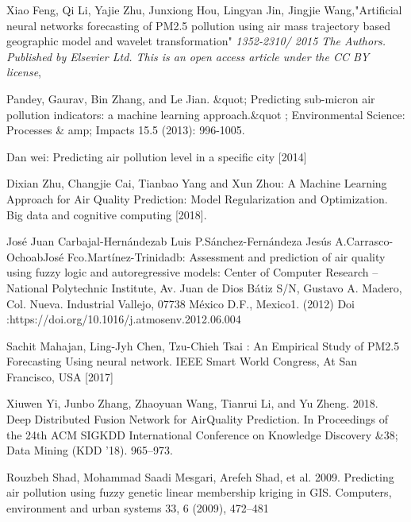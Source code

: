 \clearpage
{}
\begin{thebibliography}{99}

Xiao Feng, Qi Li, Yajie Zhu, Junxiong Hou, Lingyan Jin, Jingjie Wang,"Artificial neural networks forecasting of PM2.5 pollution using air mass
trajectory based geographic model and wavelet transformation" {\em 1352-2310/ 2015 The Authors. Published by Elsevier Ltd. This is an open access article under the CC BY license}, 


Pandey, Gaurav, Bin Zhang, and Le Jian. \&quot; Predicting sub-micron air pollution indicators: a machine learning approach.\&quot ; Environmental Science: Processes \& amp; Impacts 15.5 (2013): 996-1005.

Dan wei: Predicting air pollution level in a specific city
[2014]

Dixian Zhu, Changjie Cai, Tianbao Yang and Xun Zhou: A
Machine Learning Approach for Air Quality Prediction:
Model Regularization and Optimization. Big data and
cognitive computing [2018].

José Juan Carbajal-Hernándezab Luis P.Sánchez-Fernándeza
Jesús A.Carrasco-OchoabJosé Fco.Martínez-Trinidadb:
Assessment and prediction of air quality using fuzzy logic
and autoregressive models: Center of Computer Research –
National Polytechnic Institute, Av. Juan de Dios Bátiz S/N,
Gustavo A. Madero, Col. Nueva. Industrial Vallejo, 07738
México D.F., Mexico1. (2012) Doi
:https://doi.org/10.1016/j.atmosenv.2012.06.004

Sachit Mahajan, Ling-Jyh Chen, Tzu-Chieh Tsai : An
Empirical Study of PM2.5 Forecasting Using neural network.
IEEE Smart World Congress, At San Francisco, USA [2017]

Xiuwen Yi, Junbo Zhang, Zhaoyuan Wang, Tianrui Li, and Yu Zheng. 2018. Deep
Distributed Fusion Network for AirQuality Prediction. In Proceedings of the 24th
ACM SIGKDD International Conference on Knowledge Discovery \&38; Data Mining (KDD ’18). 965–973.

Rouzbeh Shad, Mohammad Saadi Mesgari, Arefeh Shad, et al. 2009. Predicting
air pollution using fuzzy genetic linear membership kriging in GIS. Computers,
environment and urban systems 33, 6 (2009), 472–481


\end{thebibliography}
